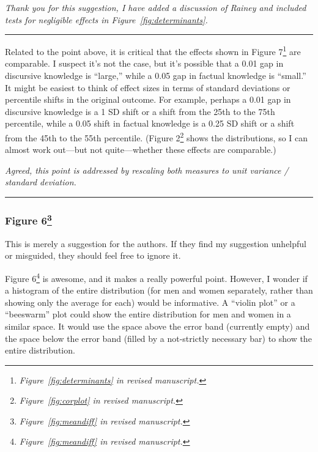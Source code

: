 \textit{Thank you for this suggestion, I have added a discussion of Rainey and included tests for negligible effects in Figure~\ref{fig:determinants}.}


\rule{\linewidth}{.01cm}

Related to the point above, it is critical that the effects shown in Figure 7\footnote{\textit{Figure~\ref{fig:determinants} in revised manuscript.}} are comparable. I suspect it’s not the case, but it’s possible that a 0.01 gap in discursive knowledge is ``large,'' while a 0.05 gap in factual knowledge is ``small.'' It might be easiest to think of effect sizes in terms of standard deviations or percentile shifts in the original outcome. For example, perhaps a 0.01 gap in discursive knowledge is a 1 SD shift or a shift from the 25th to the 75th percentile, while a 0.05 shift in factual knowledge is a 0.25 SD shift or a shift from the 45th to the 55th percentile. (Figure 2\footnote{\textit{Figure~\ref{fig:corplot} in revised manuscript.}} shows the distributions, so I can almost work out—but not quite—whether these effects are comparable.)

\textit{Agreed, this point is addressed by rescaling both measures to unit variance / standard deviation.}


\rule{\linewidth}{.01cm}


\subsubsection*{Figure 6\footnote{\textit{Figure~\ref{fig:meandiff} in revised manuscript.}}}

This is merely a suggestion for the authors. If they find my suggestion unhelpful or misguided, they should feel free to ignore it.

Figure 6\footnote{\textit{Figure~\ref{fig:meandiff} in revised manuscript.}} is awesome, and it makes a really powerful point. However, I wonder if a histogram of the entire distribution (for men and women separately, rather than showing only the average for each) would be informative. A “violin plot” or a “beeswarm” plot could show the entire distribution for men and women in a similar space. It would use the space above the error band (currently empty) and the space below the error band (filled by a not-strictly necessary bar) to show the entire distribution.

